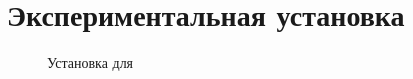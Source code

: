 \section{Экспериментальная установка}


\begin{figure}[h!]
	\centering
	\caption{Установка для	}
	\label{fig:ust}
\end{figure}